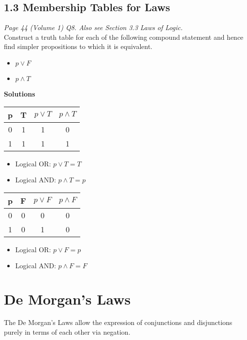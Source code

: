 
\subsection*{1.3 Membership Tables for Laws}
\emph{Page 44 (Volume 1) Q8.
Also see Section 3.3 Laws of Logic.}\\

Construct a truth table for each of the following compound statement and hence find simpler propositions to which it is equivalent.


\begin{itemize}
\item $p \vee F$
\item $p \wedge T$
\end{itemize}
\textbf{Solutions}
\begin{center}
{
\begin{tabular}{|c|c||c|c|}
\hline  p & T & $p \vee T$ & $ p \wedge T$ \\ \hline
\hline  0 & 1 & 1 & 0 \\ 
\hline  1 &  1 & 1 & 1 \\ 
\hline 
\end{tabular} 
}
\end{center}
\begin{itemize}
\item Logical OR: $p \vee T = T $
\item Logical AND: $p \wedge T = p  $
\end{itemize}

\begin{center}
{
\begin{tabular}{|c|c||c|c|}
\hline  p & F & $p \vee F$ & $ p \wedge F$ \\ \hline
\hline  0 & 0 & 0 & 0 \\ 
\hline  1 &  0 & 1 & 0 \\ 
\hline 
\end{tabular} 
}
\end{center}
\begin{itemize}
\item Logical OR:  $p \vee F = p $
\item Logical AND: $p \wedge F = F $
\end{itemize}

\section*{De Morgan's Laws}
The De Morgan's Laws allow the expression of conjunctions and disjunctions purely in terms of each other via negation.
\bigskip

